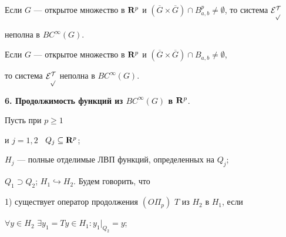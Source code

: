 \setcounter{cor}{0}





\begin{cor}


Если $G$ --- открытое множество в ${\bold R}^p$ и $(\overline{G}\times


\overline{G})\cap B^p_{a,b}\neq \emptyset$, то система $\cal{E}^T_p$


неполна в $BC^{\infty}(G)$.


\end{cor}








\begin{cor}


Если $G$ --- открытое множество в ${\bold R}^p$ и $(\overline{G}\times


\overline{G})\cap B_{a,b}\neq \emptyset$,


то система $\cal{E}^T_p$ неполна в $BC^{\infty}(G)$.


\end{cor}








{\bf 6. Продолжимость функций из $BC^{\infty}(G)$ в ${\bold R}^p$}.


Пусть при $p\geqslant 1$


и $j=1,2$ \ $Q_j\subseteq {\bold R}^p$; 


$H_j$ --- полные отделимые ЛВП функций, определенных на $Q_j$; 


$Q_1\supset Q_2$; $H_1\hookrightarrow H_2$. Будем говорить, что





1) существует оператор продолжения $(O\Pi_p)$ $T$ из $H_2$ в $H_1$, если


$\forall y\in H_2$ $\exists y_1=Ty\in H_1: y_1|_{Q_2}=y$;














